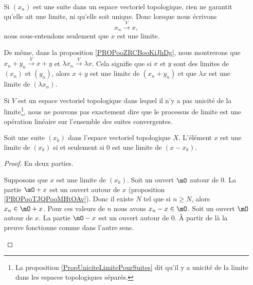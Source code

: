 \begin{normaltext}
	Si \( (x_n)\) est une suite dans un espace vectoriel topologique, rien ne garantit qu'elle ait une limite, ni qu'elle soit unique. Donc lorsque nous écrivons
	\begin{equation}
		x_n\stackrel{V}{\longrightarrow}x,
	\end{equation}
	nous sous-entendons seulement que \( x\) est une limite.

	De même, dans la proposition \ref{PROPooZRCBooKiJhDg}, nous montrerons que \( x_n+y_n\stackrel{V}{\longrightarrow}x+y\) et \( \lambda x_n\stackrel{ V}{\longrightarrow}\lambda x\). Cela signifie que si \( x\) et \( y\) sont des limites de \( (x_n)\) et \( (y_n)\), alors \( x+y\) est une limite de \( (x_n+y_n)\) et que \( \lambda x\) est une limite de \( (\lambda x_n)\).

	Si \( V\) est un espace vectoriel topologique dans lequel il n'y a pas unicité de la limite\footnote{La proposition \ref{PropUniciteLimitePourSuites} dit qu'il y a unicité de la limite dans les espaces topologiques séparés.}, nous ne pouvons pas exactement dire que le processus de limite est une opération linéaire sur l'ensemble des suites convergentes.
\end{normaltext}



\begin{proposition}	\label{PROPooTJQPooMHtOAv}
	Soit une suite \( (x_k)\) dans l'espace vectoriel topologique \( X\). L'élément \( x\) est une limite de \( (x_k)\) si et seulement si \( 0\) est une limite de \( (x-x_k)\).
\end{proposition}

\begin{proof}
	En deux parties.
	\begin{subproof}
		\spitem[\( \Rightarrow\)]
		Supposons que \( x\) est une limite de \( (x_k)\). Soit un ouvert \( \mO\) autour de \( 0\). La partie \( \mO+x\) est un ouvert autour de \( x\) (proposition \ref{PROPooTJQPooMHtOAv}). Donc il existe \( N\) tel que si \( n\geq N\), alors \( x_n\in\mO+x\). Pour ces valeurs de \( n\) nous avons \( x_n-x\in\mO\).
		\spitem[\( \Leftarrow\)]
		Soit un ouvert \( \mO\) autour de \( x\). La partie \( \mO-x\) est un ouvert autour de \( 0\). À partir de là la preuve fonctionne comme dans l'autre sens.
	\end{subproof}
\end{proof}

